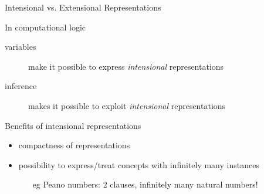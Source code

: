 \documentclass[presentation]{beamer}\mode<presentation>{\usetheme{AMSBolognaFC}}
\begin{document}
\begin{frame}[allowframebreaks]{Intensional vs. Extensional Representations}
    \begin{block}{In computational logic}
        \begin{description}
            \item[variables] make it possible to \alert{express} \emph{intensional} representations
            \item[inference] makes it possible to \alert{exploit} \emph{intensional} representations
        \end{description}
    \end{block}

    \begin{alertblock}{Benefits of intensional representations}
        \begin{itemize}
            \item compactness of representations
            \item possibility to express/treat concepts with \alert{infinitely many} instances
            \begin{itemize}
                \item[eg] Peano numbers: 2 clauses, infinitely many natural numbers!
            \end{itemize}
        \end{itemize}
    \end{alertblock}
\end{frame}
\end{document}
